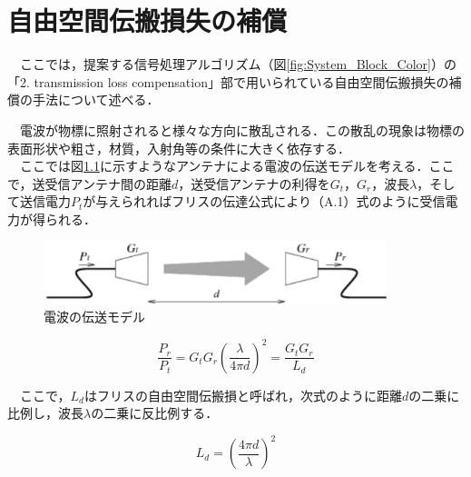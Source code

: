 \appendix
\chapter{自由空間伝搬損失の補償}
　ここでは，提案する信号処理アルゴリズム（図\ref{fig:System_Block_Color}）の「2. transmission loss compensation」部で用いられている自由空間伝搬損失の補償の手法について述べる．

　電波が物標に照射されると様々な方向に散乱される．この散乱の現象は物標の表面形状や粗さ，材質，入射角等の条件に大きく依存する．\\
　ここでは図\ref{fig:trans_model}に示すようなアンテナによる電波の伝送モデルを考える．ここで，送受信アンテナ間の距離$d$，送受信アンテナの利得を$G_t$，$G_r$，波長$\lambda$，そして送信電力$P_t$が与えられればフリスの伝達公式により（A.1）式のように受信電力が得られる．

\begin{figure}[H]
    \centering
    \includegraphics[width=10cm]{./fig/trans_model.png}
    \caption{電波の伝送モデル}
    \label{fig:trans_model}
\end{figure}

$$
\frac{P_r}{P_t} = G_t G_r \left(\frac{\lambda}{4 \pi d}\right)^2 = \frac{G_t G_r}{L_d}
$$

　ここで，$L_d$はフリスの自由空間伝搬損と呼ばれ，次式のように距離$d$の二乗に比例し，波長$\lambda$の二乗に反比例する．

$$
L_d = \left(\frac{4 \pi d}{\lambda}\right)^2
$$

